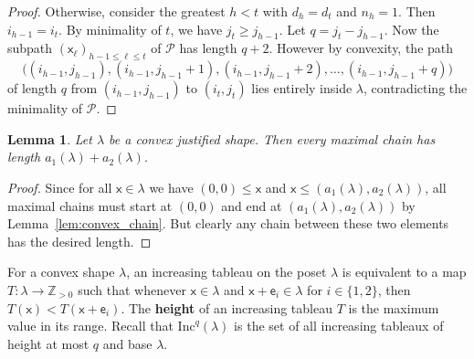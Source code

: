 \documentclass[12pt]{amsart}
\newcommand{\x}{\ensuremath{\mathsf{x}}}
\newcommand{\e}{\ensuremath{\mathsf{e}}}
\newtheorem{lemma}[theorem]{Lemma}
\theoremstyle{definition}
\theoremstyle{remark}
\numberwithin{equation}{section}
\newcommand{\inc}{\ensuremath{\mathrm{Inc}}}
\begin{document}
\begin{proof}
Otherwise, consider the greatest $h < t$ with $d_h = d_t$ and $n_h = 1$. Then $i_{h-1} = i_t$. By minimality of $t$, we have $j_t \geq j_{h-1}$. Let $q = j_t - j_{h-1}$. Now the subpath $(\x_{\ell})_{h-1\leq \ell \leq t}$ of $\mathscr{P}$ has length $q + 2$. However by convexity, the path 
\[
\big( (i_{h-1}, j_{h-1}),   (i_{h-1}, j_{h-1} + 1), (i_{h-1}, j_{h-1} + 2), \dots , (i_{h-1}, j_{h-1} + q) \big)
\]
of length $q$ from $(i_{h-1}, j_{h-1})$ to $(i_t, j_t)$ lies entirely inside $\lambda$, contradicting the minimality of $\mathscr{P}$.
\end{proof}

\begin{lemma}\label{lem:max_chain_same}
Let $\lambda$ be a convex justified shape. Then every maximal chain has length $a_1(\lambda) + a_2(\lambda)$. 
\end{lemma}
\begin{proof} 
Since for all $\x \in \lambda$ we have $(0,0) \leq \x$ and $\x \leq (a_1(\lambda),a_2(\lambda))$, all maximal chains must start at $(0,0)$ and end at $(a_1(\lambda),a_2(\lambda))$ by Lemma~\ref{lem:convex_chain}. But clearly any chain between these two elements has the desired length.
\end{proof} 

For a convex shape $\lambda$, an increasing tableau on the poset $\lambda$ is equivalent to a map $T: \lambda \rightarrow \mathbb{Z}_{>0}$ such that whenever $\x \in \lambda$ and $\x+\e_i \in \lambda$ for $i \in \lbrace 1,2 \rbrace$, then $T(\x) < T(\x+\e_i)$. The {\bf height} of an increasing tableau $T$ is the maximum value in its range. Recall that $\inc^q(\lambda)$ is the set of all increasing tableaux of height at most $q$ and base $\lambda$. 
\end{document}
